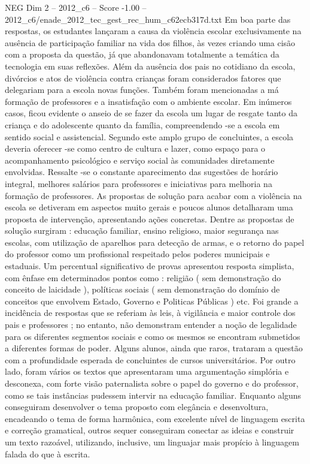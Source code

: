 \begin{textsample}{NEG Dim 2 – 2012\_c6 – Score -1.00 – 2012\_c6/enade\_2012\_tec\_gest\_rec\_hum\_c62ecb317d.txt}
Em boa parte das respostas, os estudantes lançaram a causa da violência escolar exclusivamente na ausência de participação familiar na vida dos filhos, às vezes criando uma cisão com a proposta da questão, já que abandonavam totalmente a temática da tecnologia em suas reflexões.
Além da ausência dos pais no cotidiano da escola, divórcios e atos de violência contra crianças foram considerados fatores que delegariam para a escola novas funções.
Também foram mencionadas a má formação de professores e a insatisfação com o ambiente escolar.
Em inúmeros casos, ficou evidente o anseio de se fazer da escola um lugar de resgate tanto da criança e do adolescente quanto da família, compreendendo -se a escola em sentido social e assistencial.
Segundo este amplo grupo de concluintes, a escola deveria oferecer -se como centro de cultura e lazer, como espaço para o acompanhamento psicológico e serviço social às comunidades diretamente envolvidas.
Ressalte -se o constante aparecimento das sugestões de horário integral, melhores salários para professores e iniciativas para melhoria na formação de professores.
As propostas de solução para acabar com a violência na escola se detiveram em aspectos muito gerais e poucos alunos detalharam uma proposta de intervenção, apresentando ações concretas.
Dentre as propostas de solução surgiram : educação familiar, ensino religioso, maior segurança nas escolas, com utilização de aparelhos para detecção de armas, e o retorno do papel do professor como um profissional respeitado pelos poderes municipais e estaduais.
Um percentual significativo de provas apresentou resposta simplista, com ênfase em determinados pontos como : religião ( sem demonstração do conceito de laicidade ), políticas sociais ( sem demonstração do domínio de conceitos que envolvem Estado, Governo e Politicas Públicas ) etc.
Foi grande a incidência de respostas que se referiam às leis, à vigilância e maior controle dos pais e professores ; no entanto, não demonstram entender a noção de legalidade para os diferentes segmentos sociais e como os mesmos se encontram submetidos a diferentes formas de poder.
Alguns alunos, ainda que raros, trataram a questão com a profundidade esperada de concluintes de cursos universitários.
Por outro lado, foram vários os textos que apresentaram uma argumentação simplória e desconexa, com forte visão paternalista sobre o papel do governo e do professor, como se tais instâncias pudessem intervir na educação familiar.
Enquanto alguns conseguiram desenvolver o tema proposto com elegância e desenvoltura, encadeando o tema de forma harmônica, com excelente nível de linguagem escrita e correção gramatical, outros sequer conseguiram conectar as ideias e construir um texto razoável, utilizando, inclusive, um linguajar mais propício à linguagem falada do que à escrita.

\end{textsample}
